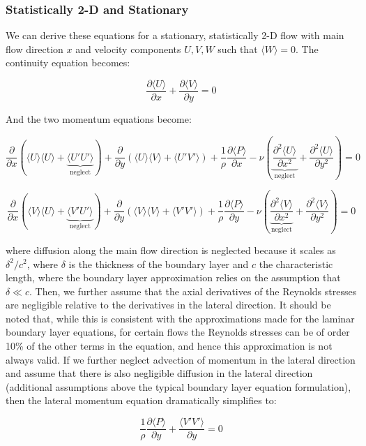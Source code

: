 \documentclass[10pt]{article}
\newcommand{\beq}{\begin{equation}}
\newcommand{\eeq}{\end{equation}}
\newcommand{\la}{\langle}
\newcommand{\ra}{\rangle}
\begin{document}
\begin{flushleft}
\subsubsection{Statistically 2-D and Stationary}
We can derive these equations for a stationary, statistically 2-D flow with main flow direction \(x\) and velocity components \(U, V, W\) such that \(\la W\ra=0\). The continuity equation becomes:

\beq
\frac{\partial\la U\ra}{\partial x}+\frac{\partial\la V\ra}{\partial y}=0
\eeq

And the two momentum equations become:

\beq
\frac{\partial}{\partial x}\left(\la U\ra\la U\ra+\underbrace{\la U'U'\ra}_{\textrm{neglect}}\right)+\frac{\partial}{\partial y}\left(\la U\ra\la V\ra+\la U'V'\ra\right)+\frac{1}{\rho}\frac{\partial \la P\ra}{\partial x}-\nu\left(\underbrace{\frac{\partial^2 \la U\ra}{\partial x^2}}_{\textrm{neglect}}+\frac{\partial^2 \la U\ra}{\partial y^2}\right)=0
\eeq

\beq
\frac{\partial}{\partial x}\left(\la V\ra\la U\ra+\underbrace{\la V'U'\ra}_{\textrm{neglect}}\right)+\frac{\partial}{\partial y}\left(\la V\ra\la V\ra+\la V'V'\ra\right)+\frac{1}{\rho}\frac{\partial \la P\ra}{\partial y}-\nu\left(\underbrace{\frac{\partial^2 \la V\ra}{\partial x^2}}_{\textrm{neglect}}+\frac{\partial^2 \la V\ra}{\partial y^2}\right)=0
\eeq

where diffusion along the main flow direction is neglected because it scales as \(\delta^2/c^2\), where \(\delta\) is the thickness of the boundary layer and \(c\) the characteristic length, where the boundary layer approximation relies on the assumption that \(\delta\ll c\). Then, we further assume that the axial derivatives of the Reynolds stresses are negligible relative to the derivatives in the lateral direction. It should be noted that, while this is consistent with the approximations made for the laminar boundary layer equations, for certain flows the Reynolds stresses can be of order 10\% of the other terms in the equation, and hence this approximation is not always valid. If we further neglect advection of momentum in the lateral direction and assume that there is also negligible diffusion in the lateral direction (additional assumptions above the typical boundary layer equation formulation), then the lateral momentum equation dramatically simplifies to:

\beq
\frac{1}{\rho}\frac{\partial\la P\ra}{\partial y}+\frac{\la V'V'\ra}{\partial y}=0
\eeq


\end{flushleft}
\end{document}
